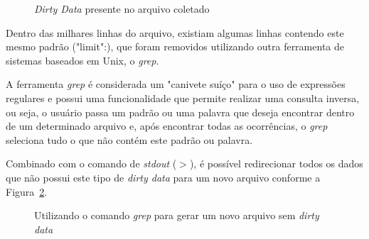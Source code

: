 \begin{figure}[h]
	\centering
	\caption{\textit{Dirty Data} presente no arquivo coletado}
	\vspace{-0.3cm}
	\label{fig-dirty}
\end{figure}

Dentro das milhares linhas do arquivo, existiam algumas linhas contendo este mesmo padrão ("limit":), que foram removidos utilizando outra ferramenta de sistemas baseados em Unix, o \textit{grep}.

A ferramenta \textit{grep} é considerada um "canivete suíço" \space para o uso de expressões regulares e possui uma funcionalidade que permite realizar uma consulta inversa, ou seja, o usuário passa um padrão ou uma palavra que deseja encontrar dentro de um determinado arquivo e, após encontrar todas as ocorrências, o \textit{grep} seleciona tudo o que não contém este padrão ou palavra.

Combinado com o comando de \textit{stdout} ($>$), é possível redirecionar todos os dados que não possui este tipo de \textit{dirty data} para um novo arquivo conforme a Figura~\ref{limpa-dado}.

\begin{figure}[h]
	\centering
	\caption{Utilizando o comando \textit{grep} para gerar um novo arquivo sem \textit{dirty data}}
	\vspace{-0.3cm}
	\label{limpa-dado}
\end{figure}

